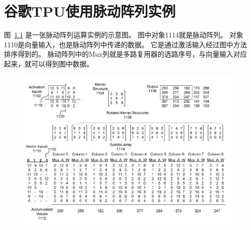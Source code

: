 
\chapter{谷歌TPU使用脉动阵列实例}

图~\ref{fig:tpu_systolic} 是一张脉动阵列运算实例的示意图。
图中对象1114就是脉动阵列。
对象1110是向量输入，也是脉动阵列中传递的数据。
它是通过激活输入经过图中方法排序得到的。
脉动阵列中的Mux列就是多路复用器的选路序号，与向量输入对应起来，就可以得到图中数据。

\begin{figure}[!htp]
  \centering
  \includegraphics[width=15cm]{figures/tpu_systolic.png}
  \label{fig:tpu_systolic}
\end{figure}

